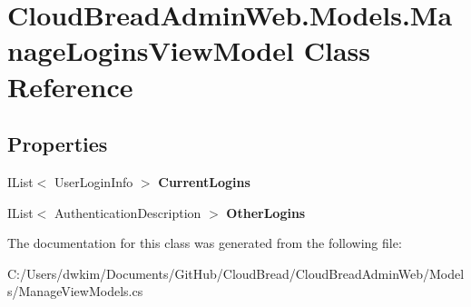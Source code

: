 \hypertarget{class_cloud_bread_admin_web_1_1_models_1_1_manage_logins_view_model}{}\section{Cloud\+Bread\+Admin\+Web.\+Models.\+Manage\+Logins\+View\+Model Class Reference}
\label{class_cloud_bread_admin_web_1_1_models_1_1_manage_logins_view_model}
\subsection*{Properties}
\begin{DoxyCompactItemize}
\item 
I\+List$<$ User\+Login\+Info $>$ {\bfseries Current\+Logins}\hypertarget{class_cloud_bread_admin_web_1_1_models_1_1_manage_logins_view_model_a66ba9b168052c4163035017accd9a96d}{}\label{class_cloud_bread_admin_web_1_1_models_1_1_manage_logins_view_model_a66ba9b168052c4163035017accd9a96d}

\item 
I\+List$<$ Authentication\+Description $>$ {\bfseries Other\+Logins}\hypertarget{class_cloud_bread_admin_web_1_1_models_1_1_manage_logins_view_model_aadd7584861ab087e1f065f85b6c71de3}{}\label{class_cloud_bread_admin_web_1_1_models_1_1_manage_logins_view_model_aadd7584861ab087e1f065f85b6c71de3}

\end{DoxyCompactItemize}


The documentation for this class was generated from the following file\+:\begin{DoxyCompactItemize}
\item 
C\+:/\+Users/dwkim/\+Documents/\+Git\+Hub/\+Cloud\+Bread/\+Cloud\+Bread\+Admin\+Web/\+Models/Manage\+View\+Models.\+cs\end{DoxyCompactItemize}
